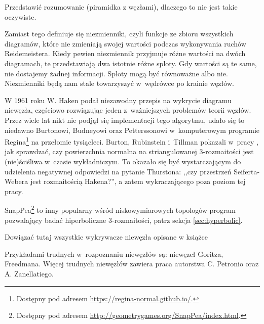 \begin{tobedone}
	Przedstawić rozumowanie (piramidka z węzłami), dlaczego to nie jest takie oczywiste.
\end{tobedone}

Zamiast tego definiuje się niezmienniki, czyli funkcje ze zbioru wszystkich diagramów, które nie zmieniają swojej wartości podczas wykonywania ruchów Reidemeistera.
Kiedy pewien niezmiennik przyjmuje różne wartości na dwóch diagramach, te przedstawiają dwa istotnie różne sploty.
Gdy wartości są te same, nie dostajemy żadnej informacji.
Sploty mogą być równoważne albo nie.
Niezmienniki będą nam stale towarzyszyć w~wędrówce po krainie węzłów.



W 1961 roku W. Haken \cite{haken61} podał niezawodny przepis na wykrycie diagramu niewęzła,
częściowo rozwiązując jeden z~ważniejszych problemów teorii węzłów.
Przez wiele lat nikt nie podjął się implementacji tego algorytmu,
udało się to niedawno Burtonowi, Budneyowi oraz Petterssonowi w~komputerowym programie Regina\footnote{Dostępny pod adresem \url{https://regina-normal.github.io/}.} na przełomie tysiącleci.
Burton, Rubinstein i~Tillman pokazali w~pracy \cite{burton12}, jak sprawdzać,
czy powierzchnia normalna na striangulowanej 3-rozmaitości jest (nie)ściśliwa w~czasie wykładniczym.
To okazało się być wystarczającym do udzielenia negatywnej odpowiedzi na pytanie Thurstona:
,,czy przestrzeń Seiferta-Webera jest rozmaitością Hakena?'',
a zatem wykraczającego poza poziom tej pracy.

SnapPea\footnote{Dostępny pod adresem \url{http://geometrygames.org/SnapPea/index.html}.} to inny popularny wśród niskowymiarowych topologów program pozwalający badać hiperboliczne 3-rozmaitości, patrz sekcja \ref{sec:hyperbolic}.

\begin{tobedone}
	Dowiązać tutaj wszystkie wykrywacze niewęzła opisane w książce
\end{tobedone}

Przykładami trudnych w~rozpoznaniu niewęzłów są: niewęzeł Goritza, Freedmana.
Więcej trudnych niewęzłów zawiera praca \cite{zanellati16} autorstwa C. Petronio oraz A. Zanellatiego.

